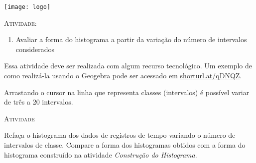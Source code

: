 \documentclass[10 pt,usenames,dvipsnames, oneside]{article}
\begin{document}
\begin{center}
  \begin{minipage}[l]{3cm}
\texttt{[image: logo]}    
\end{minipage}\hfill
\begin{minipage}[r]{.8\textwidth}
 {\Large \scshape Atividade: }  
\end{minipage}
\end{center}
\vspace{.2cm}

\ifdefined\prof
\begin{objetivos}
\item 
\end{objetivos}

\begin{goals}
\begin{enumerate}
\item Avaliar a forma do histograma a partir da variação do número de intervalos considerados
\end{enumerate}

\tcblower

Essa atividade deve ser realizada com algum recurso tecnológico. Um exemplo de como realizá-la usando o Geogebra pode ser acessado em \url{shorturl.at/qDNQZ}.

Arrastando o cursor na linha que representa classes (intervalos) é possível variar de três a 20 intervalos.
\end{goals}

\bigskip
\begin{center}
{\large \scshape Atividade}
\end{center}
\fi

Refaça o histograma dos dados de registros de tempo variando o número de intervalos de classe. Compare a forma dos histogramas obtidos com a forma do histograma construído na atividade \textit{Construção do Histograma}.
\end{document}
